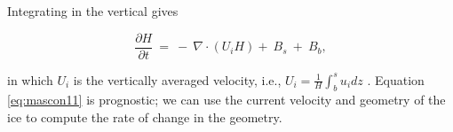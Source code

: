 \noindent
Integrating in the vertical gives

\begin{equation}
\frac{\partial H}{\partial t}~=~-~\nabla \cdot \left( U_{i} H \right) +~B_s~+~B_b,
\label{eq:mascon11}
\end{equation}

\noindent
in which $U_{i}$ is the vertically averaged velocity, i.e., $U_i = \frac{1}{H}\int_{b}^{s}u_{i}dz$ . Equation \eqref{eq:mascon11} is 
prognostic; we can use the current velocity and geometry of the ice to compute the rate of change in the geometry.
